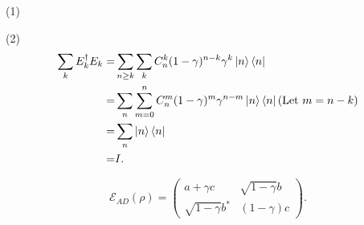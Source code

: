 \ex (1) 

(2) $$\begin{aligned}
    \sum_kE_k^\dagger E_k = & \sum_{n\ge k}\sum_k C_n^k (1-\gamma)^{n-k}\gamma^k \left|n\right\rangle\left\langle n\right|
    \\ = & \sum_n\sum_{m=0}^n C_n^m (1-\gamma)^m\gamma^{n-m} \left|n\right\rangle\left\langle n\right|(\text{Let }m=n-k)
    \\ = & \sum_n\left|n\right\rangle\left\langle n\right|
    \\ = & I.
\end{aligned}$$

\ex $$\mathcal{E}_{AD}(\rho)=\begin{pmatrix}
    a+\gamma c & \sqrt{1-\gamma} b \\
    \sqrt{1-\gamma} b^* & (1-\gamma) c
\end{pmatrix}.$$

